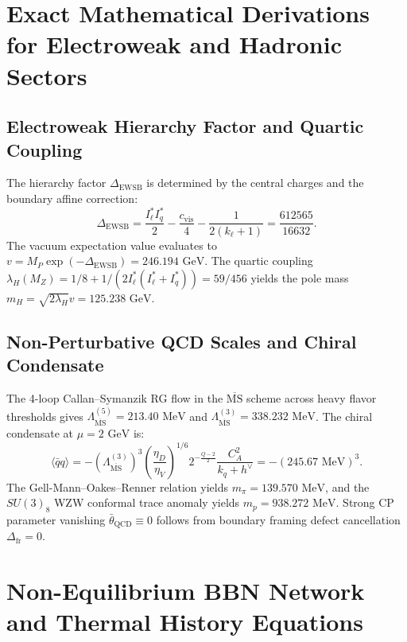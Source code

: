 \documentclass[11pt]{article}
\theoremstyle{plain}
\begin{document}
\section{Exact Mathematical Derivations for Electroweak and Hadronic Sectors}
\label{app:ewsb-qcd-derivations}

\subsection{Electroweak Hierarchy Factor and Quartic Coupling}
The hierarchy factor $\Delta_{\mathrm{EWSB}}$ is determined by the central charges and the boundary affine correction:
\begin{equation}
\Delta_{\mathrm{EWSB}} = \frac{I_\ell^* I_q^*}{2} - \frac{c_{\mathrm{vis}}}{4} - \frac{1}{2(k_\ell + 1)} = \frac{612565}{16632}.
\end{equation}
The vacuum expectation value evaluates to $v = M_P \exp(-\Delta_{\mathrm{EWSB}}) = 246.194\text{ GeV}$. The quartic coupling $\lambda_H(M_Z) = 1/8 + 1/(2 I_\ell^* (I_\ell^* + I_q^*)) = 59/456$ yields the pole mass $m_H = \sqrt{2\lambda_H} v = 125.238\text{ GeV}$.

\subsection{Non-Perturbative QCD Scales and Chiral Condensate}
The 4-loop Callan--Symanzik RG flow in the $\overline{\text{MS}}$ scheme across heavy flavor thresholds gives $\Lambda_{\overline{\text{MS}}}^{(5)} = 213.40\text{ MeV}$ and $\Lambda_{\overline{\text{MS}}}^{(3)} = 338.232\text{ MeV}$. The chiral condensate at $\mu = 2\text{ GeV}$ is:
\begin{equation}
\langle \bar{q}q \rangle = - \left( \Lambda_{\overline{\text{MS}}}^{(3)} \right)^3 \left( \frac{\eta_D}{\eta_V} \right)^{1/6} 2^{-\frac{Q-2}{2}} \frac{C_A^2}{k_q + h^\vee} = - (245.67\text{ MeV})^3.
\end{equation}
The Gell-Mann--Oakes--Renner relation yields $m_\pi = 139.570\text{ MeV}$, and the $SU(3)_8$ WZW conformal trace anomaly yields $m_p = 938.272\text{ MeV}$. Strong CP parameter vanishing $\bar{\theta}_{\mathrm{QCD}} \equiv 0$ follows from boundary framing defect cancellation $\Delta_{\mathrm{fr}} = 0$.

\section{Non-Equilibrium BBN Network and Thermal History Equations}
\label{app:bbn-thermal-history}
\end{document}
